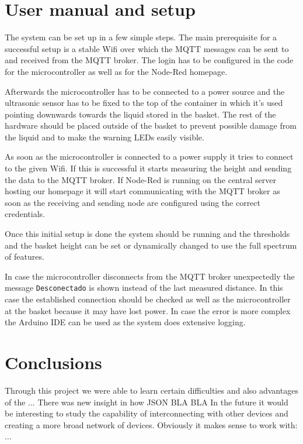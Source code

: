 \documentclass{article}
\begin{document}
\section{User manual and setup}
The system can be set up in a few simple steps. The main prerequisite for a successful setup is a stable Wifi over which the MQTT messages can be sent to and received from the MQTT broker. The login has to be configured in the code for the microcontroller as well as for the Node-Red homepage.\par 
Afterwards the microcontroller has to be connected to a power source and the ultrasonic sensor has to be fixed to the top of the container in which it's used pointing downwards towards the liquid stored in the basket. The rest of the hardware should be placed outside of the basket to prevent possible damage from the liquid and to make the warning LEDs easily visible.\par 
As soon as the microcontroller is connected to a power supply it tries to connect to the given Wifi. If this is successful it starts measuring the height and sending the data to the MQTT broker. If Node-Red is running on the central server hosting our homepage it will start communicating with the MQTT broker as soon as the receiving and sending node are configured using the correct credentials.\par 
Once this initial setup is done the system should be running and the thresholds and the basket height can be set or dynamically changed to use the full spectrum of features.\par 
In case the microcontroller disconnects from the MQTT broker unexpectedly the message \verb|Desconectado| is shown instead of the last measured distance. In this case the established connection should be checked as well as the microcontroller at the basket because it may have lost power. In case the error is more complex the Arduino IDE can be used as the system does extensive logging.

\newpage

\section{Conclusions}
Through this project we were able to learn certain difficulties and also
advantages of the ... There was new insight in how JSON BLA BLA In the future it
would be interesting to study the capability of interconnecting with other
devices and creating a more broad network of devices. Obviously it makes sense
to work with: ...
\end{document}
